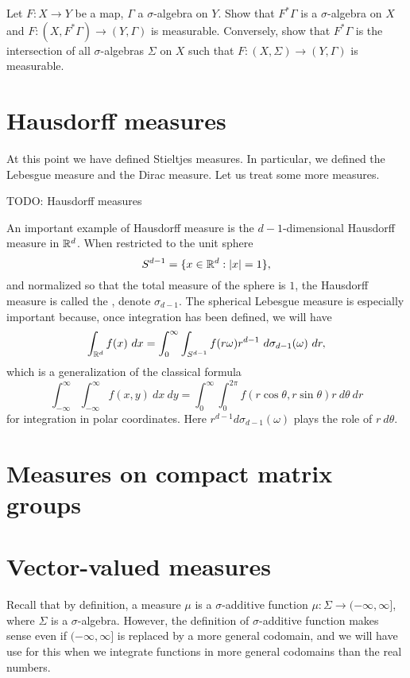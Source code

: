 \begin{exercise}
\label{pullback makes sense}
Let $F: X \to Y$ be a map, $\Gamma$ a $\sigma$-algebra on $Y$.
Show that $F^*\Gamma$ is a $\sigma$-algebra on $X$ and $F: (X, F^*\Gamma) \to (Y, \Gamma)$ is measurable.
Conversely, show that $F^*\Gamma$ is the intersection of all $\sigma$-algebras $\Sigma$ on $X$ such that $F: (X, \Sigma) \to (Y, \Gamma)$ is measurable.
\end{exercise}

\section{Hausdorff measures}
At this point we have defined Stieltjes measures.
In particular, we defined the Lebesgue measure and the Dirac measure.
Let us treat some more measures.

TODO: Hausdorff measures


\begin{example}
\label{Lebesgue measure on sphere}
An important example of Hausdorff measure is the $d-1$-dimensional Hausdorff measure in $\mathbb{R}^d$.
When restricted to the unit sphere
$$S^{d - 1} = \{x \in \mathbb{R}^d: |x| = 1\},$$
and normalized so that the total measure of the sphere is $1$, the Hausdorff measure is called the , denote $\sigma_{d - 1}$.
The spherical Lebesgue measure is especially important because, once integration has been defined, we will have
$$\int_{\mathbb{R}^d} f(x) ~dx = \int_0^\infty \int_{S^{d - 1}} f(r\omega) r^{d - 1}~d\sigma_{d - 1}(\omega) ~dr,$$
which is a generalization of the classical formula
$$\int_{-\infty}^\infty \int_{-\infty}^\infty f(x, y) ~dx ~dy = \int_0^\infty \int_0^{2\pi} f(r \cos \theta, r \sin \theta) r~d\theta ~dr$$
for integration in polar coordinates. Here $r^{d - 1} d\sigma_{d - 1}(\omega)$ plays the role of $r~d\theta$.
\end{example}



\section{Measures on compact matrix groups}


\section{Vector-valued measures}
Recall that by definition, a measure $\mu$ is a $\sigma$-additive function $\mu: \Sigma \to (-\infty, \infty]$, where $\Sigma$ is a $\sigma$-algebra.
However, the definition of $\sigma$-additive function makes sense even if $(-\infty, \infty]$ is replaced by a more general codomain, and we will have use for this when we integrate functions in more general codomains than the real numbers.

